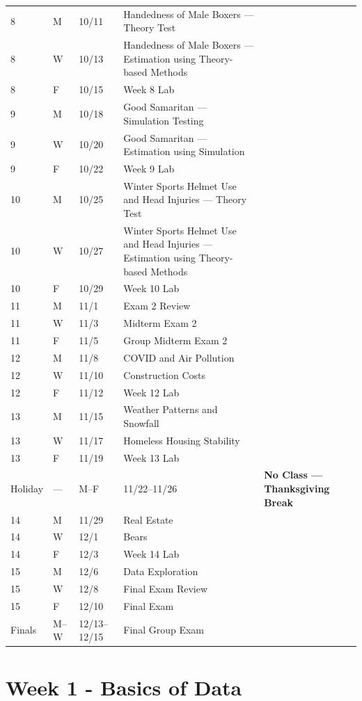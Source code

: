 \documentclass[
]{report}
\begin{document}
\begin{longtable}{|l|l|l|l|p{}|}
8& M& 10/11& Handedness of Male Boxers --- Theory Test \\*
8& W& 10/13& Handedness of Male Boxers --- Estimation using Theory-based Methods \\*    
8& F& 10/15& Week 8 Lab \\ \hline
9& M& 10/18& Good Samaritan --- Simulation Testing \\*
9& W& 10/20& Good Samaritan --- Estimation using Simulation \\* 
9& F& 10/22& Week 9 Lab \\ \hline
10& M& 10/25& Winter Sports Helmet Use and Head Injuries --- Theory Test \\*
10& W& 10/27& Winter Sports Helmet Use and Head Injuries --- Estimation using Theory-based Methods \\*
10& F& 10/29& Week 10 Lab\\ \hline
11& M& 11/1& Exam 2 Review \\*
11& W& 11/3& Midterm Exam 2 \\* 
11& F& 11/5& Group Midterm Exam 2 \\ \hline
12& M& 11/8& COVID and Air Pollution \\*
12& W& 11/10& Construction Costs \\*
12& F& 11/12& Week 12 Lab \\ \hline
13& M& 11/15& Weather Patterns and Snowfall \\*
13& W& 11/17& Homeless Housing Stability \\*
13& F& 11/19& Week 13 Lab \\ \hline
Holiday& ---& M--F& 11/22--11/26& \textbf{No Class --- Thanksgiving Break} \\ \hline
14& M& 11/29& Real Estate \\*
14& W& 12/1& Bears \\*
14& F& 12/3& Week 14 Lab \\ \hline
15& M& 12/6& Data Exploration \\*
15& W& 12/8& Final Exam Review \\*
15& F& 12/10& Final Exam \\ \hline
Finals& M--W& 12/13--12/15& Final Group Exam \\ \hline

\end{longtable}

\hypertarget{week-1---basics-of-data}{%
\chapter{Week 1 - Basics of Data}\label{week-1---basics-of-data}}
\end{document}

